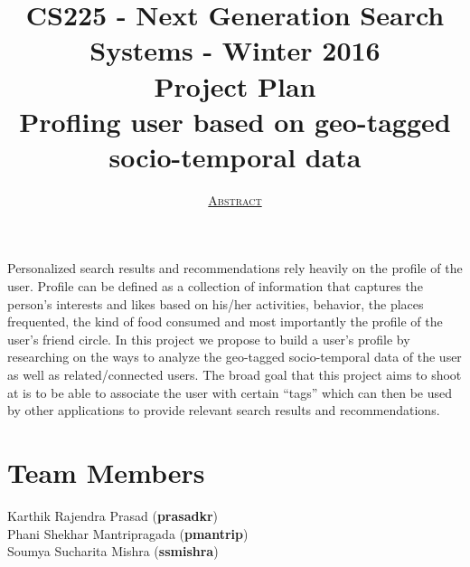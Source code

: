 \documentclass[12pt,letterpaper]{article}
\title{CS225 - Next Generation Search Systems - Winter 2016\\ %
Project Plan\\
\vspace{20pt}
\textbf{Profling user based on geo-tagged socio-temporal data}} %
\author{}
\date{\underline{\textsc{Abstract}}} %
\begin{document}
\maketitle
Personalized search results and recommendations rely heavily on the profile of the user. Profile can be defined as a collection of information that captures the person's interests and likes based on his/her activities, behavior, the places frequented, the kind of food consumed and most importantly the profile of the user's friend circle. In this project we propose to build a user's profile by researching on the ways to analyze the geo-tagged socio-temporal data of the user as well as related/connected users. The broad goal that this project aims to shoot at is to be able to associate the user with certain \enquote{tags} which can then be used by other applications to provide relevant search results and recommendations.

\section*{Team Members}
Karthik Rajendra Prasad (\textbf{prasadkr})\\
Phani Shekhar Mantripragada (\textbf{pmantrip})\\
Soumya Sucharita Mishra (\textbf{ssmishra})
\end{document}
